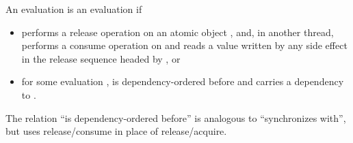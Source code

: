 \pnum
An evaluation  is  an evaluation
 if
\begin{itemize}
\item
{} performs a release operation on an atomic object , and, in
another thread,  performs a consume operation on  and reads a
value written by any
%
side effect in the release sequence headed by , or

\item
for some evaluation ,  is dependency-ordered before  and
 carries a dependency to .

\end{itemize}
\begin{note} The relation ``is dependency-ordered before'' is analogous to
``synchronizes with'', but uses release/consume in place of release/acquire.
\end{note}

